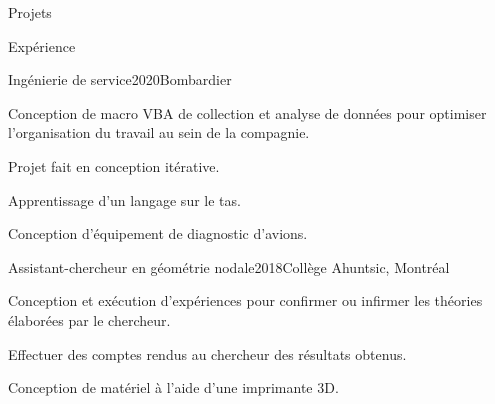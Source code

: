 \documentclass[french,12pt]{resume} %
\begin{document}
\begin{rSection}{Projets}
		

		
	\end{rSection}
	
	\begin{rSection}{Expérience}
		
		\begin{rSubsection}{Ingénierie de service}{2020}{Bombardier}{}{}
			\item Conception de macro VBA de collection et analyse de données pour optimiser l'organisation du travail au sein de la compagnie.
			\item Projet fait en conception itérative. 
			\item Apprentissage d'un langage sur le tas.
			\item Conception d'équipement de diagnostic d'avions.
		\end{rSubsection}
		
		\begin{rSubsection}{Assistant-chercheur en géométrie nodale}{2018}{Collège Ahuntsic, Montréal}{}
			\item 	Conception et exécution d'expériences pour confirmer ou infirmer les théories élaborées par le chercheur.
			\item   Effectuer des comptes rendus au chercheur des résultats obtenus.
			\item   Conception de matériel à l’aide d’une imprimante 3D.
		\end{rSubsection}
		
		
	\end{rSection}
	
\end{document}
